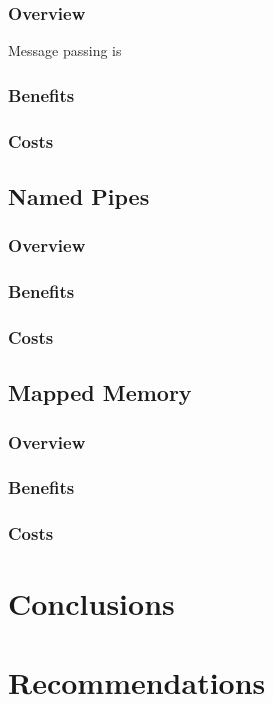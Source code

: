 \documentclass[se]{uw-wkrpt}
\begin{document}
\subsubsection{Overview}

Message passing is 

\subsubsection{Benefits}
\subsubsection{Costs}

\subsection{Named Pipes}

\subsubsection{Overview}
\subsubsection{Benefits}
\subsubsection{Costs}

\subsection{Mapped Memory}

\subsubsection{Overview}
\subsubsection{Benefits}
\subsubsection{Costs}


\section{Conclusions}
\section{Recommendations}
\end{document}

